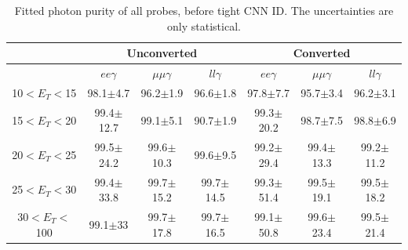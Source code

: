 \begin{table}[htbp]
\raggedleft
\begin{longtable}[c]{ccccccc}
\hline\hline
                             & \multicolumn{3}{c}{Unconverted}               & \multicolumn{3}{c}{Converted}                \\
                            \hline
\endfirsthead
%
\endhead
%
                             & $ee\gamma$           & $\mu\mu\gamma$           & $ll\gamma$           & $ee\gamma$           &  $\mu\mu\gamma$          & $ll\gamma$           \\
    \hline
10$<E_T<$15 & 98.1$\pm$4.7   &   96.2$\pm$1.9   &   96.6$\pm$1.8   &   97.8$\pm$7.7   &   95.7$\pm$3.4    &   96.2$\pm$3.1  \\
15$<E_T<$20 & 99.4$\pm$12.7  &   99.1$\pm$5.1   &   90.7$\pm$1.9   &   99.3$\pm$20.2  &   98.7$\pm$7.5    &   98.8$\pm$6.9  \\
20$<E_T<$25 & 99.5$\pm$24.2  &   99.6$\pm$10.3  &   99.6$\pm$9.5   &   99.2$\pm$29.4  &   99.4$\pm$13.3   &   99.2$\pm$11.2 \\
25$<E_T<$30 & 99.4$\pm$33.8  &   99.7$\pm$15.2  &   99.7$\pm$14.5  &   99.3$\pm$51.4  &   99.5$\pm$19.1   &   99.5$\pm$18.2    \\
30$<E_T<$100 & 99.1$\pm$33   &   99.7$\pm$17.8  &   99.7$\pm$16.5  &   99.1$\pm$50.8  &   99.6$\pm$23.4   &   99.5$\pm$21.4 \\
\hline\hline
\end{longtable}
\begin{tcolorbox}[colback=black!5!white,colframe=white!75!black]
\caption{Fitted photon purity of all probes, before tight CNN ID. The uncertainties are only statistical.}
\label{tab:gamma:CNN:Zllg:Purity:B}
\end{tcolorbox}

\end{table}


